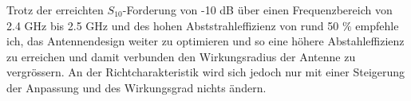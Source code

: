 Trotz der erreichten $S_{10}$-Forderung von -10 dB über einen Frequenzbereich von 2.4 GHz bis 2.5 GHz und des hohen Abststrahleffizienz von rund 50 $\%$ empfehle ich, das Antennendesign weiter zu optimieren und so eine höhere Abstahleffizienz zu erreichen und damit verbunden den Wirkungsradius der Antenne zu vergrössern. An der Richtcharakteristik wird sich jedoch nur mit einer Steigerung der Anpassung und des Wirkungsgrad nichts ändern. 

 
